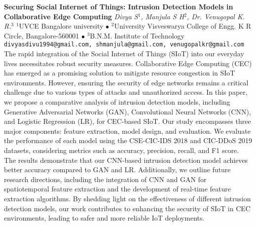 
    \begin{conf-abstract}[]
        {\textbf{Securing Social Internet of Things: Intrusion Detection Models in Collaborative Edge Computing }}
        {\textit{Divya  S$^{1}$, Manjula S H$^{2}$, Dr. Venugopal K. R.$^{3}$}}
        {$^{1}$UVCE Bangalore university $\bullet$ $^{2}$University Visveswarya College of Engg. K R Circle, Bangalore-560001 $\bullet$ $^{3}$B.N.M. Institute of Technology}
        {\texttt{divyasdivu1994@gmail.com, shmanjula@gmail.com, venugopalkr@gmail.com}}
        {The rapid integration of the Social Internet of Things (SIoT) into our everyday lives necessitates robust security measures. Collaborative Edge Computing (CEC) has emerged as a promising solution to mitigate resource congestion in SIoT environments. However, ensuring the security of edge networks remains a critical challenge due to various types of attacks and unauthorized access. In this paper, we propose a comparative analysis of intrusion detection models, including Generative Adversarial Networks (GAN), Convolutional Neural Networks (CNN), and Logistic Regression (LR), for CEC-based SIoT. Our study encompasses three major components: feature extraction, model design, and evaluation. We evaluate the performance of each model using the CSE-CIC-IDS 2018 and CIC-DDoS 2019 datasets, considering metrics such as accuracy, precision, recall, and F1 score. The results demonstrate that our CNN-based intrusion detection model achieves better accuracy compared to GAN and LR. Additionally, we outline future research directions, including the integration of CNN and GAN for spatiotemporal feature extraction and the development of real-time feature extraction algorithms. By shedding light on the effectiveness of different intrusion detection models, our work contributes to enhancing the security of SIoT in CEC environments, leading to safer and more reliable IoT deployments.}
    \end{conf-abstract}
        